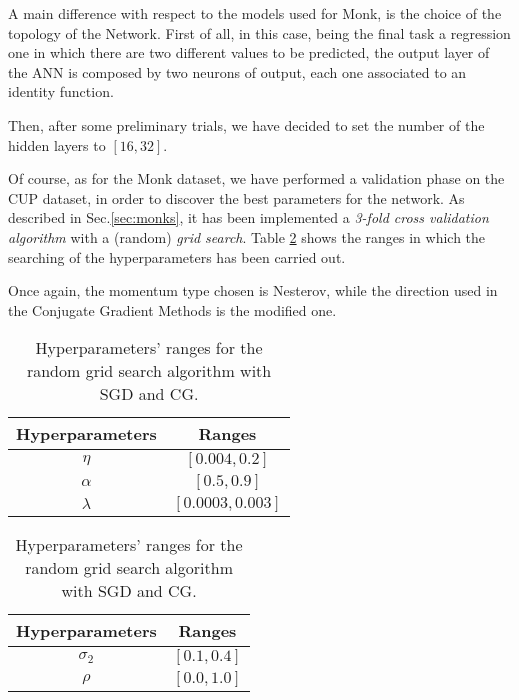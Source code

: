         A main difference with respect to the models used for Monk, is the choice of the topology of the Network.
        First of all, in this case, being the final task a regression one in which there are two different values to be predicted, the output layer of the ANN is composed by two neurons of output, each one associated to an identity function.

        Then, after some preliminary trials, we have decided to set the number of the hidden layers to $[16, 32]$.

        Of course, as for the Monk dataset, we have performed a validation phase on the CUP dataset, in order to discover the best parameters for the network. As described in Sec.\ref{sec:monks}, it has been implemented a \textit{3-fold cross validation algorithm} with a (random) \textit{grid search}.  Table \ref{tab:hyper_cup} shows the ranges in which the searching of the hyperparameters has been carried out.

        Once again, the momentum type chosen is Nesterov, while the direction used in the Conjugate Gradient Methods is the modified one.


        \begin{table}[H]
          \centering
          \caption{Hyperparameters' ranges for the random grid search algorithm with SGD and CG.}
          \begin{minipage}{.4\textwidth}
              \centering
              \begin{tabular}{cc}
                    \toprule
                    Hyperparameters & Ranges\\
                    \midrule
                    $\eta$ & $\left [0.004, 0.2\right ]$\\

                    $\alpha$ & $[0.5, 0.9]$ \\

                    $\lambda$ & $[0.0003, 0.003]$ \\

                    \midrule
              \end{tabular}
          \end{minipage}
          \begin{minipage}{.4\textwidth}
              \centering
              \begin{tabular}{cc}
                    \toprule
                    Hyperparameters & Ranges\\
                    \midrule
                    $\sigma_2$ & $\left [0.1, 0.4 \right ]$\\

                    $\rho$ & $[0.0, 1.0]$ \\

                    \midrule
              \end{tabular}
            \end{minipage}
            \label{tab:hyper_cup}
        \end{table}

